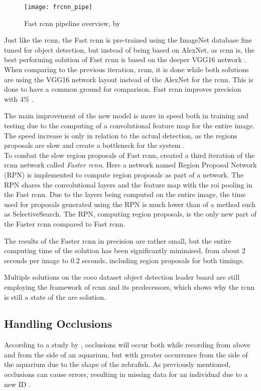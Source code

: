 \begin{figure}[H]
	\centering
	\texttt{[image: frcnn\_pipe]}
	\caption{Fast \gls{rcnn} pipeline overview, by \cite{Girshick2015}}
	\label{fig:frcnn_pipe}
\end{figure}

Just like the \gls{rcnn}, the Fast \gls{rcnn} is pre-trained using the ImageNet database fine tuned for object detection, but instead of being based on AlexNet, as \gls{rcnn} is, the best performing solution of Fast \gls{rcnn} is based on the deeper VGG16 network \citep{Girshick2015}. When comparing to the previous iteration, \gls{rcnn}, it is done while both solutions are using the VGG16 network layout instead of the AlexNet for the \gls{rcnn}. This is done to have a common ground for comparison. Fast \gls{rcnn} improves precision with $4\%$ \citep{Girshick2015}.

The main improvement of the new model is more in speed both in training and testing due to the computing of a convolutional feature map for the entire image. The speed increase is only in relation to the actual detection, as the regions proposals are slow and create a bottleneck for the system \citep{Girshick2015}.\\

To combat the slow region proposals of Fast \gls{rcnn}, \cite{Ren2017} created a third iteration of the \gls{rcnn} network called \textit{Faster \gls{rcnn}}. Here a network named Region Proposal Network (RPN) is implemented to compute region proposals as part of a  network. The RPN shares the convolutional layers and the feature map with the \gls{roi} pooling in the Fast \gls{rcnn}. Due to the layers being computed on the entire image, the time used for proposals generated using the RPN is much lower than of a method such as SelectiveSearch. The RPN, computing region proposals, is the only new part of the Faster \gls{rcnn} compared to Fast \gls{rcnn}.

The results of the Faster \gls{rcnn} in precision are rather small, but the entire computing time of the solution has been significantly minimised, from about $2$ seconds per image to $0.2$ seconds, including region proposals for both timings.

Multiple solutions on the \gls{coco} dataset object detection leader board are still employing the framework of \gls{rcnn} and its predecessors, which shows why the \gls{rcnn} is still a state of the are solution.


\subsection{Handling Occlusions}
According to a study by \cite{Qian2017}, occlusions will occur both while recording from above and from the side of an aquarium, but with greater occurrence from the side of the aquarium due to the shape of the zebrafish. As previously mentioned, occlusions can cause errors, resulting in missing data for an individual due to a new ID \citep{Feijo2018}.\\

